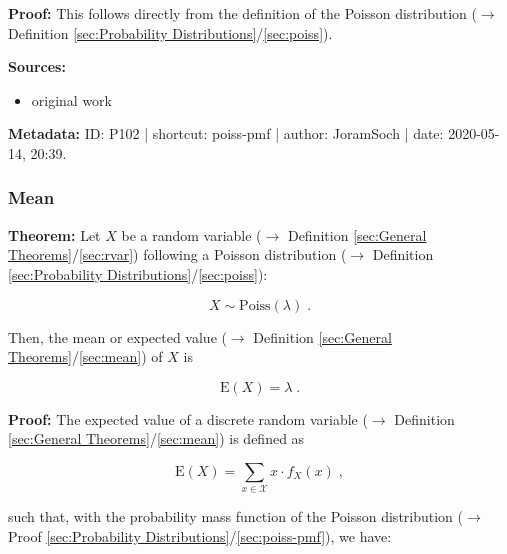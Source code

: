 \documentclass[a4paper,12pt,twoside]{book}
\begin{document}
\vspace{1em}
\textbf{Proof:} This follows directly from the definition of the Poisson distribution ($\rightarrow$ Definition \ref{sec:Probability Distributions}/\ref{sec:poiss}).


\vspace{1em}
\textbf{Sources:}
\begin{itemize}
\item original work\end{itemize}


\vspace{1em}
\textbf{Metadata:} ID: P102 | shortcut: poiss-pmf | author: JoramSoch | date: 2020-05-14, 20:39.
\vspace{1em}



\subsubsection[\textbf{Mean}]{Mean} \label{sec:poiss-mean}
\setcounter{equation}{0}

\textbf{Theorem:} Let $X$ be a random variable ($\rightarrow$ Definition \ref{sec:General Theorems}/\ref{sec:rvar}) following a Poisson distribution ($\rightarrow$ Definition \ref{sec:Probability Distributions}/\ref{sec:poiss}):

\begin{equation} \label{eq:poiss-mean-poiss}
X \sim \mathrm{Poiss}(\lambda) \; .
\end{equation}

Then, the mean or expected value ($\rightarrow$ Definition \ref{sec:General Theorems}/\ref{sec:mean}) of $X$ is

\begin{equation} \label{eq:poiss-mean-poiss-mean}
\mathrm{E}(X) = \lambda \; .
\end{equation}


\vspace{1em}
\textbf{Proof:} The expected value of a discrete random variable ($\rightarrow$ Definition \ref{sec:General Theorems}/\ref{sec:mean}) is defined as

\begin{equation} \label{eq:poiss-mean-mean}
\mathrm{E}(X) = \sum_{x \in \mathcal{X}} x \cdot f_X(x) \; ,
\end{equation}

such that, with the probability mass function of the Poisson distribution ($\rightarrow$ Proof \ref{sec:Probability Distributions}/\ref{sec:poiss-pmf}), we have:
\end{document}

